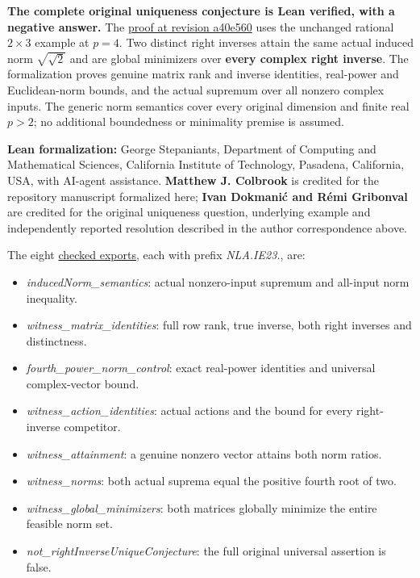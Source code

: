 \documentclass[11pt,a4paper]{article}
\providecommand{\tightlist}{\setlength{\itemsep}{0pt}\setlength{\parskip}{0pt}}
\begin{document}
\textbf{The complete original uniqueness conjecture is Lean verified,
with a negative answer.} The
\href{https://github.com/sgstepaniants/OpenProblemsInNLA/tree/a40e5608f61dd4086708cb2e03901ffd01e4c0a9/linear-systems-and-elimination/IE-23/lean}{proof
at revision a40e560} uses the unchanged rational \(2\times3\) example at
\(p=4\). Two distinct right inverses attain the same actual induced norm
\(\sqrt{\sqrt{2}}\) and are global minimizers over \textbf{every complex
right inverse}. The formalization proves genuine matrix rank and inverse
identities, real-power and Euclidean-norm bounds, and the actual
supremum over all nonzero complex inputs. The generic norm semantics
cover every original dimension and finite real \(p>2\); no additional
boundedness or minimality premise is assumed.

\textbf{Lean formalization:} George Stepaniants, Department of Computing
and Mathematical Sciences, California Institute of Technology, Pasadena,
California, USA, with AI-agent assistance. \textbf{Matthew J. Colbrook}
is credited for the repository manuscript formalized here; \textbf{Ivan
Dokmanić and Rémi Gribonval} are credited for the original uniqueness
question, underlying example and independently reported resolution
described in the author correspondence above.

The eight
\href{https://github.com/sgstepaniants/OpenProblemsInNLA/blob/a40e5608f61dd4086708cb2e03901ffd01e4c0a9/linear-systems-and-elimination/IE-23/lean/Solution.lean}{checked
exports}, each with prefix \textit{NLA.IE23.}, are:

\begin{itemize}
\tightlist
\item
  \textit{inducedNorm\_semantics}: actual nonzero-input supremum and
  all-input norm inequality.
\item
  \textit{witness\_matrix\_identities}: full row rank, true inverse,
  both right inverses and distinctness.
\item
  \textit{fourth\_power\_norm\_control}: exact real-power identities and
  universal complex-vector bound.
\item
  \textit{witness\_action\_identities}: actual actions and the bound for
  every right-inverse competitor.
\item
  \textit{witness\_attainment}: a genuine nonzero vector attains both
  norm ratios.
\item
  \textit{witness\_norms}: both actual suprema equal the positive fourth
  root of two.
\item
  \textit{witness\_global\_minimizers}: both matrices globally minimize
  the entire feasible norm set.
\item
  \textit{not\_rightInverseUniqueConjecture}: the full original
  universal assertion is false.
\end{itemize}
\end{document}
